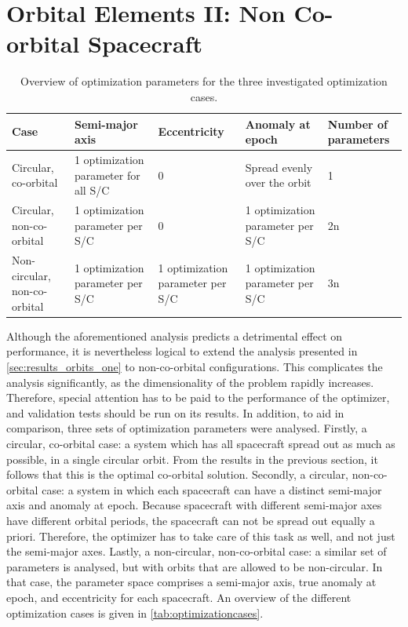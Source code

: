 \section{Orbital Elements II: Non Co-orbital Spacecraft}
\label{sec:results_orbits_two}

\begin{table}[htbp]
\caption{Overview of optimization parameters for the three investigated optimization cases.}
\label{tab:optimizationcases}
\begin{tabulary}{1.0\textwidth}{L|L|L|L|L}
\textbf{Case}                & \textbf{Semi-major axis}             & \textbf{Eccentricity}            & \textbf{Anomaly at epoch}        & \textbf{Number of parameters} \\ \hline
Circular, co-orbital         & 1 optimization parameter for all S/C & 0                                & Spread evenly over the orbit     & 1                             \\
Circular, non-co-orbital     & 1 optimization parameter per S/C     & 0                                & 1 optimization parameter per S/C & 2n                            \\
Non-circular, non-co-orbital & 1 optimization parameter per S/C     & 1 optimization parameter per S/C & 1 optimization parameter per S/C & 3n
\end{tabulary}
\end{table}

Although the aforementioned analysis predicts a detrimental effect on performance, it is nevertheless logical to extend the analysis presented in \autoref{sec:results_orbits_one} to non-co-orbital configurations. This complicates the analysis significantly, as the dimensionality of the problem rapidly increases. Therefore, special attention has to be paid to the performance of the optimizer, and validation tests should be run on its results. In addition, to aid in comparison, three sets of optimization parameters were analysed. Firstly, a circular, co-orbital case: a system which has all spacecraft spread out as much as possible, in a single circular orbit. From the results in the previous section, it follows that this is the optimal co-orbital solution. Secondly, a circular, non-co-orbital case: a system in which each spacecraft can have a distinct semi-major axis and anomaly at epoch. Because spacecraft with different semi-major axes have different orbital periods, the spacecraft can not be spread out equally a priori. Therefore, the optimizer has to take care of this task as well, and not just the semi-major axes. Lastly, a non-circular, non-co-orbital case: a similar set of parameters is analysed, but with orbits that are allowed to be non-circular. In that case, the parameter space comprises a semi-major axis, true anomaly at epoch, and eccentricity for each spacecraft. An overview of the different optimization cases is given in \autoref{tab:optimizationcases}.\\

